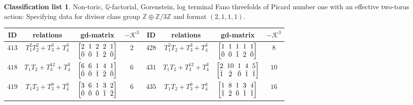 \documentclass[pdftex]{sigma}%
\theoremstyle{definition}
\newtheorem{class-list}[thm]{Classification list}
\def\ZZ{{\mathbb Z}}
\def\QQ{{\mathbb Q}}
\numberwithin{equation}{section}
\begin{document}
\begin{class-list}
Non-toric, $\QQ$-factorial, Gorenstein, log terminal Fano
threefolds of Picard number one with an effective two-torus action:
Specifying data for divisor class group $\ZZ\oplus \ZZ/3\ZZ$ and
format $(2,1,1,1)$.
\begin{table}[h!]\centering\setlength{\tabcolsep}{3.5pt}
\renewcommand{\arraystretch}{1.35}\small\tabulinesep=1mm
\begin{tabu}{c|c|c|c||c|c|c|c}
\hline
ID&relations&gd-matrix&$-\mathcal{K}^3$&ID&relations&gd-matrix&$-\mathcal{K}^3$
\\
\hline
${413}$&${T_{1}^{2}T_{2}^{2}+T_{3}^{3}+T_{4}^{3}}$
&$\arraycolsep=1mm\begin{bmatrix}{2} & {1} & {2} & {2} & {1} \\ {\bar{0}} & {\bar{0}} & {\bar{1}} & {\bar{2}} & {\bar{0}}\end{bmatrix}$&${2}$
&${428}$&${T_{1}^{2}T_{2}+T_{3}^{3}+T_{4}^{3}}$
&$\arraycolsep=1mm\begin{bmatrix}{1} & {1} & {1} & {1} & {1} \\ {\bar{0}} & {\bar{0}} & {\bar{1}} & {\bar{2}} & {\bar{0}}\end{bmatrix}$&${8}$
\\
\hline
${418}$&${T_{1}T_{2}+T_{3}^{12}+T_{4}^{3}}$
&$\arraycolsep=1mm\begin{bmatrix}{6} & {6} & {1} & {4} & {1} \\ {\bar{0}} & {\bar{0}} & {\bar{1}} & {\bar{2}} & {\bar{0}}\end{bmatrix}$&${6}$
&${431}$&${T_{1}T_{2}+T_{3}^{12}+T_{4}^{3}}$
&$\arraycolsep=1mm\begin{bmatrix}{2} & {10} & {1} & {4} & {5} \\ {\bar{1}} & {\bar{2}} & {\bar{0}} & {\bar{1}} & {\bar{1}}\end{bmatrix}$&${10}$
\\
\hline
${419}$&${T_{1}T_{2}+T_{3}^{9}+T_{4}^{3}}$
&$\arraycolsep=1mm\begin{bmatrix}{3} & {6} & {1} & {3} & {2} \\ {\bar{0}} & {\bar{0}} & {\bar{0}} & {\bar{1}} & {\bar{2}}\end{bmatrix}$&${6}$
&${435}$&${T_{1}T_{2}+T_{3}^{9}+T_{4}^{3}}$
&$\arraycolsep=1mm\begin{bmatrix}{1} & {8} & {1} & {3} & {4} \\ {\bar{1}} & {\bar{2}} & {\bar{0}} & {\bar{1}} & {\bar{1}}\end{bmatrix}$&${16}$
\\

\end{tabu}
\end{table}
\end{class-list}
\end{document}
